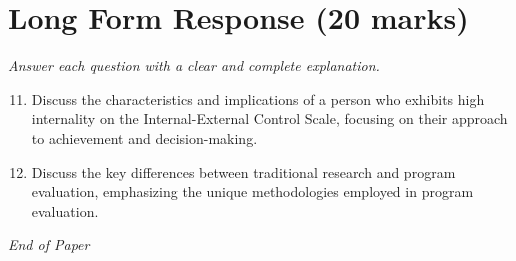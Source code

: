\documentclass[12pt]{article}
\begin{document}
\section*{Long Form Response (20 marks)}
\textit{Answer each question with a clear and complete explanation.}
\begin{enumerate}[label=\arabic*.]
\setcounter{enumi}{10}
\item Discuss the characteristics and implications of a person who exhibits high internality on the Internal-External Control Scale, focusing on their approach to achievement and decision-making.
\item Discuss the key differences between traditional research and program evaluation, emphasizing the unique methodologies employed in program evaluation.
\end{enumerate}

\vfill
\noindent\textit{End of Paper}
\end{document}
